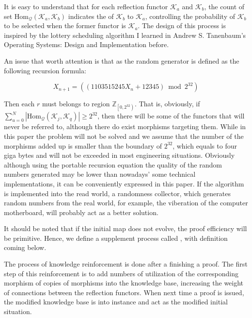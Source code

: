 \documentclass{article}
\begin{document}
It is easy to understand that for each reflection functor \(\mathcal{K}_a\) and \(\mathcal{K}_b\), the count of set \(\text{Hom}_{\mathcal{Q}}\left(\mathcal{K}_a,\mathcal{K}_b\right)\) indicates the  of \(\mathcal{K}_b\) to \(\mathcal{K}_a\), controlling the probability of \(\mathcal{K}_b\) to be selected when the former functor is \(\mathcal{K}_a\). The design of this process is inspired by the lottery scheduling algorithm I learned in Andrew S. Tanenbaum{'}s Operating Systems: Design and Implementation \cite{6} before.

An issue that worth attention is that as the random generator is defined as the following recursion formula: \cite{5}

\[X_{n+1}=(\left(1103515245 X_n+12345\right) \bmod 2^{32})\]

Then each \(\mathit{r}\) must belongs to region \(\mathbb{Z}_{\left.\left[0,2^{32}\right.\right)}\). That is, obviously, if \(\sum _{u=0}^N \left|\text{Hom}_{\mathcal{Q}}\left(\mathcal{K}_j,\mathcal{K}_q\right)\right|\geq 2^{32}\), then there will be some of the functors that will never be referred to, although there do exist morphisms targeting them. While in this paper the problem will not be solved and we assume that the number of the morphisms added up is smaller than the boundary of \(2^{32}\), which equals to four giga bytes and will not be exceeded in most engineering situations. Obviously although using the portable recursion equation the quality of the random numbers generated may be lower than nowadays{'} some technical implementations, it can be conveniently expressed in this paper. If the algorithm is implemented into the read world, a randomness collector, which generates random numbers from the real world, for example, the viberation of the computer motherboard, will probably act as a better solution.

It should be noted that if the initial map does not evolve, the proof efficiency will be primitive. Hence, we define a supplement process called , with definition coming below.

 The process of knowledge reinforcement is done after a finishing a proof. The first step of this reinforcement is to add numbers of utilization of the corresponding morphism of copies of morphisms into the knowledge base, increasing the weight of connections between the reflection functors. When next time a proof is issued, the modified knowledge base is  into instance and act as the modified initial situation.
\end{document}
